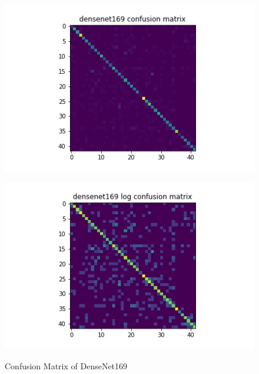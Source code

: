 \begin{figure}[t]
\begin{minipage}[b]{.5\linewidth}
    {\includegraphics[width=1.2\textwidth]{figs/conf_matrix/densenet169_conf.png}}
  \end{minipage}
  \hfill
  \begin{minipage}[b]{.5\linewidth}
    \centering

    {\includegraphics[width=1.2\textwidth]{figs/conf_matrix/densenet169_log_conf.png}}
  \end{minipage}

  \caption{Confusion Matrix of DenseNet169}
  \label{fig:densenet169_conf}
  \vspace{0.2in}
\end{figure}

